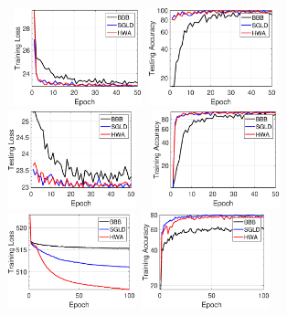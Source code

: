 \documentclass{article} %
\begin{document}
\begin{figure}[H]
\mbox{
\includegraphics[width=0.33\textwidth]{newfigs/trainlossmnist.eps}
\includegraphics[width=0.33\textwidth]{newfigs/trainaccmnist.eps}
\includegraphics[width=0.33\textwidth]{newfigs/testlossmnist.eps}
}
\mbox{
\includegraphics[width=0.33\textwidth]{newfigs/testaccmnist.eps}
\includegraphics[width=0.33\textwidth]{newfigs/trainlosscifar.eps}
\includegraphics[width=0.33\textwidth]{newfigs/trainacccifar.eps}
}
\end{figure}
\end{document}
